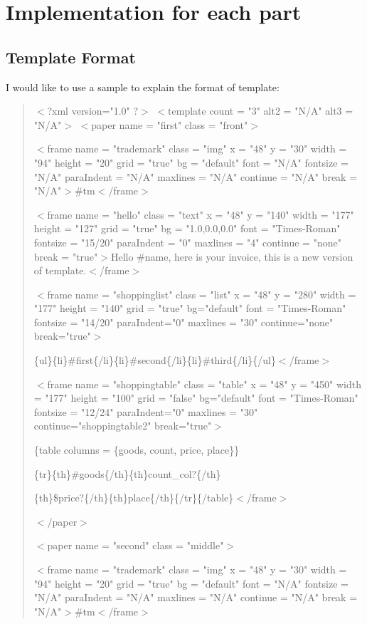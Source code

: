 \documentclass{report}
\begin{document}
\section{Implementation for each part}
\subsection{Template Format}
  I would like to use a sample to explain the format of template:

\begin{quote}

$<$?xml version="1.0" ?$>$
$<$template count = "3" alt2 = "N/A" alt3 = "N/A"$>$
$<$paper name = "first" class = "front"$>$

  $<$frame name = "trademark" class = "img" x = "48" y = "30" width = "94" height = "20" grid = "true" bg = "default" font = "N/A" fontsize = "N/A" paraIndent = "N/A" maxlines = "N/A" continue = "N/A" break = "N/A"$>$\#tm$<$/frame$>$

  $<$frame name = "hello" class = "text" x = "48" y = "140" width = "177" height = "127" grid = "true" bg = "1.0,0.0,0.0" font = "Times-Roman" fontsize = "15/20" paraIndent = "0" maxlines = "4" continue = "none" break = "true"$>$Hello \#name, here is your invoice, this is a new version of template.$<$/frame$>$

  $<$frame name = "shoppinglist" class = "list" x = "48" y = "280" width = "177" height = "140" grid = "true" bg="default" font = "Times-Roman" fontsize = "14/20" paraIndent="0" maxlines = "30" continue="none" break="true"$>$

\{ul\}\{li\}\#first\{/li\}\{li\}\#second\{/li\}\{li\}\#third\{/li\}\{/ul\}$<$/frame$>$


  $<$frame name = "shoppingtable" class = "table" x = "48" y = "450" width = "177" height = "100" grid = "false" bg="default" font = "Times-Roman" fontsize = "12/24" paraIndent="0" maxlines = "30" continue="shoppingtable2" break="true"$>$

\{table columns = \{goods, count, price, place\}\}

\{tr\}\{th\}\#goods\{/th\}\{th\}count\_col?\{/th\}

\{th\}\$price?\{/th\}\{th\}place\{/th\}\{/tr\}\{/table\}$<$/frame$>$

$<$/paper$>$

$<$paper name = "second" class = "middle"$>$
  
  $<$frame name = "trademark" class = "img" x = "48" y = "30" width = "94" height = "20" grid = "true" bg = "default" font = "N/A" fontsize = "N/A" paraIndent = "N/A" maxlines = "N/A" continue = "N/A" break = "N/A"$>$\#tm$<$/frame$>$


\end{quote}
\end{document}
